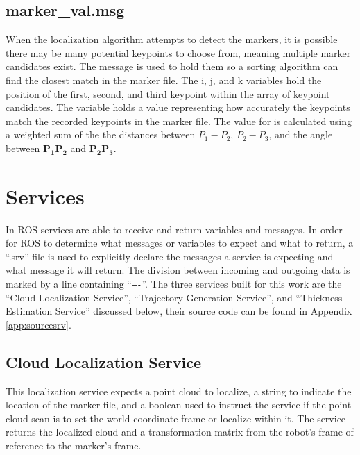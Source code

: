 \subsection{marker\_val.msg}
When the localization algorithm attempts to detect the markers, it is possible there may be many potential keypoints to choose from, meaning multiple marker candidates exist. The  message is used to hold them so a sorting algorithm can find the closest match in the marker file. The i, j, and k variables hold the position of the first, second, and third keypoint within the array of keypoint candidates. The  variable holds a value representing how accurately the keypoints match the recorded keypoints in the marker file. The value for  is calculated using a weighted sum of the the distances between $P_1-P_2$, $P_2-P_3$, and the angle between $\mathbf{P_1P_2}$ and $\mathbf{P_2P_3}$. \\

\section{Services}
In ROS services are able to receive and return variables and messages. In order for ROS to determine what messages or variables to expect and what to return, a ``.srv'' file is used to explicitly declare the messages a service is expecting and what message it will return. The division between incoming and outgoing data is marked by a line containing ``\texttt{----}''. The three services built for this work are the ``Cloud Localization Service'', ``Trajectory Generation Service'', and ``Thickness Estimation Service'' discussed below, their source code can be found in Appendix \ref{app:sourcesrv}.\\
\subsection{Cloud Localization Service}
This localization service expects a point cloud to localize, a string to indicate the location of the marker file, and a boolean used to instruct the service if the point cloud scan is to set the world coordinate frame or localize within it. The service returns the localized cloud and a transformation matrix from the robot's frame of reference to the marker's frame.\\
%
  
